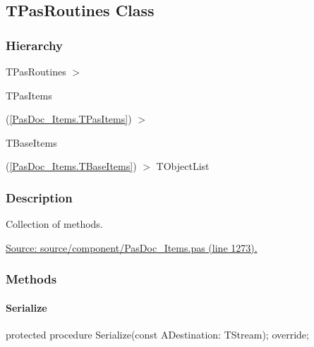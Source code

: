 \documentclass{report}
\newif\ifpdf
\begin{document}
\subsection*{TPasRoutines Class}
\fi
\label{PasDoc_Items.TPasRoutines}
\subsubsection*{\large{\textbf{Hierarchy}}\normalsize\hspace{1ex}\hfill}
TPasRoutines {$>$} \begin{ttfamily}TPasItems\end{ttfamily}(\ref{PasDoc_Items.TPasItems}) {$>$} \begin{ttfamily}TBaseItems\end{ttfamily}(\ref{PasDoc_Items.TBaseItems}) {$>$} 
TObjectList
\subsubsection*{\large{\textbf{Description}}\normalsize\hspace{1ex}\hfill}
Collection of methods.\par
\href{https://github.com/pasdoc/pasdoc/blob/master/source/component/PasDoc_Items.pas#L1273}{Source: source/component/PasDoc{\_}Items.pas (line 1273).}\subsubsection*{\large{\textbf{Methods}}\normalsize\hspace{1ex}\hfill}
\paragraph*{Serialize}\hspace*{\fill}

\label{PasDoc_Items.TPasRoutines-Serialize}
\begin{list}{}{
\setlength{\itemindent}{0cm}
\setlength{\listparindent}{0cm}
\setlength{\leftmargin}{\evensidemargin}
\addtolength{\leftmargin}{\tmplength}
\settowidth{\labelsep}{X}
\addtolength{\leftmargin}{\labelsep}
\setlength{\labelwidth}{\tmplength}
}
\item[\textbf{Declaration}\hfill]
\ifpdf
\begin{flushleft}
\fi
\begin{ttfamily}
protected procedure Serialize(const ADestination: TStream); override;\end{ttfamily}

\ifpdf
\end{flushleft}
\fi

\end{list}
\end{document}
